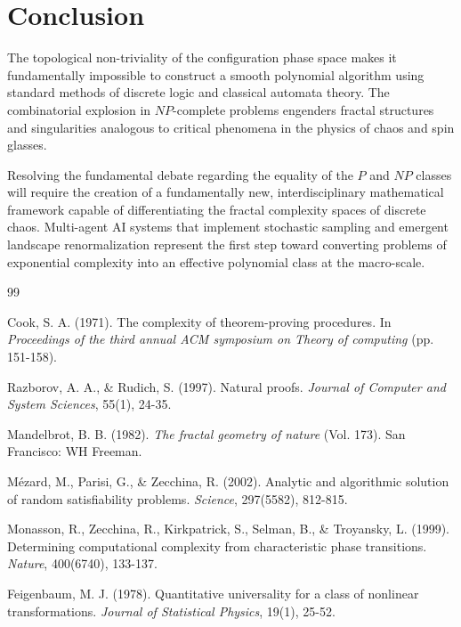 \documentclass[12pt,a4paper]{article}
\begin{document}
\section{Conclusion}

The topological non-triviality of the configuration phase space makes it fundamentally impossible to construct a smooth polynomial algorithm using standard methods of discrete logic and classical automata theory. The combinatorial explosion in $NP$-complete problems engenders fractal structures and singularities analogous to critical phenomena in the physics of chaos and spin glasses.

Resolving the fundamental debate regarding the equality of the $P$ and $NP$ classes will require the creation of a fundamentally new, interdisciplinary mathematical framework capable of differentiating the fractal complexity spaces of discrete chaos. Multi-agent AI systems that implement stochastic sampling and emergent landscape renormalization represent the first step toward converting problems of exponential complexity into an effective polynomial class at the macro-scale.

\clearpage

\begin{thebibliography}{99}

Cook, S. A. (1971). The complexity of theorem-proving procedures. In \textit{Proceedings of the third annual ACM symposium on Theory of computing} (pp. 151-158).

Razborov, A. A., \& Rudich, S. (1997). Natural proofs. \textit{Journal of Computer and System Sciences}, 55(1), 24-35.

Mandelbrot, B. B. (1982). \textit{The fractal geometry of nature} (Vol. 173). San Francisco: WH Freeman.

Mézard, M., Parisi, G., \& Zecchina, R. (2002). Analytic and algorithmic solution of random satisfiability problems. \textit{Science}, 297(5582), 812-815.

Monasson, R., Zecchina, R., Kirkpatrick, S., Selman, B., \& Troyansky, L. (1999). Determining computational complexity from characteristic phase transitions. \textit{Nature}, 400(6740), 133-137.

Feigenbaum, M. J. (1978). Quantitative universality for a class of nonlinear transformations. \textit{Journal of Statistical Physics}, 19(1), 25-52.

\end{thebibliography}
\end{document}
